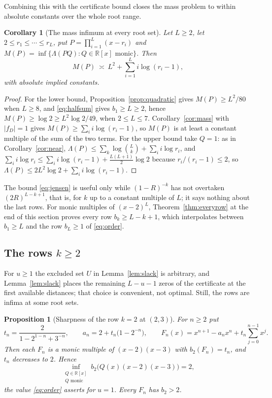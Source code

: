 \documentclass[11pt]{article}
\newtheorem{corollary}[theorem]{Corollary}
\newtheorem{proposition}[theorem]{Proposition}
\newcommand{\R}{\mathbb R}
\begin{document}
Combining this with the certificate bound closes the mass problem to within
absolute constants over the whole root range.

\begin{corollary}[The mass infimum at every root set]\label{cor:allroots}
Let $L\ge2$, let $2\le r_1\le\cdots\le r_L$, put $P=\prod_{i=1}^L(x-r_i)$ and
$M(P)=\inf\{\Lambda(PQ):Q\in\R[x]\text{ monic}\}$.  Then
\[
  M(P)\ \asymp\ L^2+\sum_{i=1}^Li\log(r_i-1),
\]
with absolute implied constants.
\end{corollary}

\begin{proof}
For the lower bound, Proposition~\ref{prop:quadratic} gives
$M(P)\ge L^2/80$ when $L\ge8$, and \eqref{eq:halfsum} gives
$b_1\ge L\ge2$, hence $M(P)\ge\log2\ge L^2\log2/49$, when $2\le L\le7$.
Corollary~\ref{cor:mass} with $|f_D|=1$ gives
$M(P)\ge\sum_ii\log(r_i-1)$, so $M(P)$ is at least a constant multiple of
the sum of the two terms.
For the upper bound take $Q=1$: as in Corollary~\ref{cor:near},
$\Lambda(P)\le\sum_k\log\binom Lk+\sum_ii\log r_i$, and
$\sum_ii\log r_i\le\sum_ii\log(r_i-1)+\tfrac{L(L+1)}2\log2$ because
$r_i/(r_i-1)\le2$, so
$\Lambda(P)\le2L^2\log2+\sum_ii\log(r_i-1)$.
\end{proof}

The bound \eqref{eq:jensen} is useful only while $(1-R)^{-k}$ has not
overtaken $(2R)^{L-k+1}$, that is, for $k$ up to a constant multiple of
$L$; it says nothing about the last rows.  For monic multiples of $(x-2)^L$,
Theorem~\ref{thm:everyrow} at the end of this section proves every row
$b_k\ge L-k+1$, which interpolates between $b_1\ge L$ and the row $b_L\ge1$
of \eqref{eq:order}.

\subsection{The rows \texorpdfstring{$k\ge2$}{k at least 2}}

For $u\ge1$ the excluded set $U$ in Lemma~\ref{lem:slack} is arbitrary, and
Lemma~\ref{lem:slack} places the remaining $L-u-1$ zeros of the certificate
at the first available distances; that choice is convenient, not optimal.
Still, the rows are infima at some root sets.

\begin{proposition}[Sharpness of the row $k=2$ at $(2,3)$]
\label{prop:sharp23}
For $n\ge2$ put
\[
  t_n=\frac{2}{1-2^{1-n}+3^{-n}},
  \qquad a_n=2+t_n\bigl(1-2^{-n}\bigr),
  \qquad
  F_n(x)=x^{n+1}-a_nx^n+t_n\sum_{j=0}^{n-1}x^j .
\]
Then each $F_n$ is a monic multiple of $(x-2)(x-3)$ with $b_2(F_n)=t_n$, and
$t_n$ decreases to $2$.  Hence
\[
  \inf_{\substack{Q\in\R[x]\\ Q\text{ monic}}}
  b_2\bigl(Q(x)(x-2)(x-3)\bigr)=2,
\]
the value \eqref{eq:order} asserts for $u=1$.  Every $F_n$ has $b_2>2$.
\end{proposition}
\end{document}
